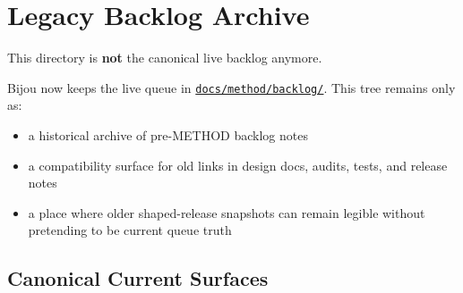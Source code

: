 \chapter{Legacy Backlog Archive}\label{record-386}

\smallskip

This directory is \textbf{not} the canonical live backlog anymore.

Bijou now keeps the live queue in \href{https://github.com/flyingrobots/bijou/blob/cbd70612140e7a450d764b3c7be1c6af878b99bc/docs/method/graveyard/method/backlog/README.md}{\texttt{d\allowbreak{}o\allowbreak{}c\allowbreak{}s\allowbreak{}/\allowbreak{}m\allowbreak{}e\allowbreak{}t\allowbreak{}h\allowbreak{}o\allowbreak{}d\allowbreak{}/\allowbreak{}b\allowbreak{}a\allowbreak{}c\allowbreak{}k\allowbreak{}l\allowbreak{}o\allowbreak{}g\allowbreak{}/}}. This tree remains only as:

\begin{itemize}
\tightlist
\item
  a historical archive of pre-METHOD backlog notes
\item
  a compatibility surface for old links in design docs, audits, tests, and release notes
\item
  a place where older shaped-release snapshots can remain legible without pretending to be current queue truth
\end{itemize}

\section{Canonical Current Surfaces}\label{record-386-canonical-current-surfaces}

